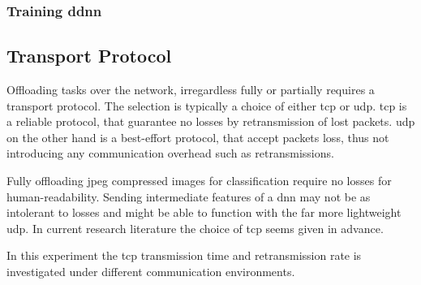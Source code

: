 \subsubsection{Training \gls{ddnn}}

\subsection{Transport Protocol} 

Offloading tasks over the network, irregardless fully or partially requires a transport protocol. The selection is typically a choice of either \gls{tcp} or \gls{udp}. \gls{tcp} is a reliable protocol, that guarantee no losses by retransmission of lost packets. \gls{udp} on the other hand is a best-effort protocol, that accept packets loss, thus not introducing any communication overhead such as retransmissions. 


Fully offloading \gls{jpeg} compressed images for classification require no losses for human-readability. Sending intermediate features of a \gls{dnn} may not be as intolerant to losses and might be able to function with the far more lightweight \gls{udp}. In current research literature the choice of \gls{tcp} seems given in advance.  


In this experiment the \gls{tcp} transmission time and retransmission rate is investigated under different communication environments. 